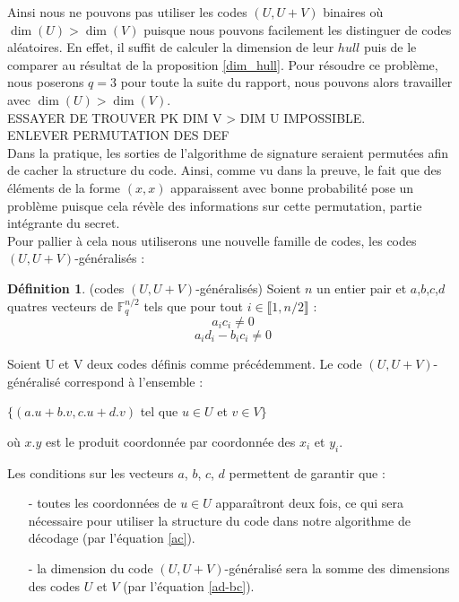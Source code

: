 \documentclass[12pt]{article}
\theoremstyle{plain}
\theoremstyle{definition}
\newtheorem{defi}[thm]{Définition}
\newcommand{\F}{\mathbb{F}}
\begin{document}
\noindent Ainsi nous ne pouvons pas utiliser les codes $(U,U+V)$ binaires où $\dim(U) > \dim(V)$ puisque nous pouvons facilement les distinguer de codes aléatoires.
En effet, il suffit de calculer la dimension de  leur $hull$ puis de le comparer au résultat de la proposition \ref{dim_hull}.
Pour résoudre ce problème, nous poserons $q=3$ pour toute la suite du rapport, nous pouvons alors travailler avec $\dim(U) > \dim(V)$. \\
ESSAYER DE TROUVER PK DIM V > DIM U IMPOSSIBLE. \\
ENLEVER PERMUTATION DES DEF \\
Dans la pratique, les sorties de l'algorithme de signature seraient permutées afin de cacher la structure du code. Ainsi, comme vu dans la preuve, le fait que des éléments de la forme $(x,x)$ apparaissent avec bonne probabilité pose un problème puisque cela révèle des informations sur cette permutation, partie intégrante du secret. \\
Pour pallier à cela nous utiliserons une nouvelle famille de codes, les codes $(U,U+V)$-généralisés :\\
\begin{defi} \label{UV-normalise} (codes $(U,U+V)$-généralisés) Soient $n$ un entier pair et $a$,$b$,$c$,$d$ quatres vecteurs de $\F_q^{n/2}$ tels que pour tout $i \in \llbracket 1,n/2\rrbracket$ :
\begin{equation}\label{ac}
a_ic_i \neq 0 
\end{equation}
\begin{equation}\label{ad-bc}
a_id_i - b_ic_i \neq 0 
\end{equation}

\noindent Soient U et V deux codes définis comme précédemment. Le code $(U,U+V)$-généralisé correspond à l'ensemble :
\begin{center}
$\{(a.u + b.v, c.u + d.v)$ tel que $u \in U$ et $v \in V \}$
\end{center}
où $x.y$ est le produit coordonnée par coordonnée des $x_i$ et $y_i$.\\
\end{defi}


\noindent Les conditions sur les vecteurs $a$, $b$, $c$, $d$ permettent de garantir que :
\begin{itemize}
\item[-] toutes les coordonnées de $u \in U$ apparaîtront deux fois, ce qui sera nécessaire pour utiliser la structure du code dans notre algorithme de décodage (par l'équation \eqref{ac}).
\item[-] la dimension du code $(U,U+V)$-généralisé sera la somme des dimensions des codes $U$ et $V$ (par l'équation \eqref{ad-bc}).
\end{itemize}
\end{document}
